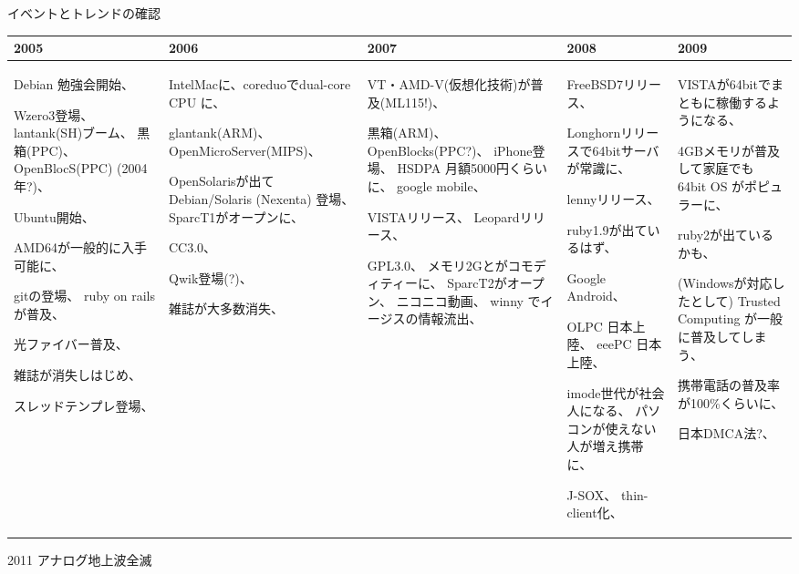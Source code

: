 \documentclass[cjk,dvipdfmx,12pt]{beamer}
\begin{document}
\begin{frame}

イベントとトレンドの確認

{\tiny
\begin{tabular}[t]{|p{6em}|p{6em}|p{6em}|p{6em}|p{6em}|}
\hline
2005 &2006 &2007 &2008 &2009 \\
\hline
Debian 勉強会開始、

Wzero3登場、
lantank(SH)ブーム、
黒箱(PPC)、
OpenBlocS(PPC) (2004年?)、

Ubuntu開始、

AMD64が一般的に入手可能に、

gitの登場、
ruby on rails が普及、

光ファイバー普及、

雑誌が消失しはじめ、

スレッドテンプレ登場、

 &
IntelMacに、coreduoでdual-core CPU に、

glantank(ARM)、
OpenMicroServer(MIPS)、

OpenSolarisが出てDebian/Solaris (Nexenta) 登場、
SparcT1がオープンに、

CC3.0、

Qwik登場(?)、

雑誌が大多数消失、

 &
VT・AMD-V(仮想化技術)が普及(ML115!)、

黒箱(ARM)、
OpenBlocks(PPC?)、
iPhone登場、
HSDPA 月額5000円くらいに、
google mobile、

VISTAリリース、
Leopardリリース、

GPL3.0、
メモリ2Gとがコモディティーに、
SparcT2がオープン、
ニコニコ動画、
winny でイージスの情報流出、
 &
FreeBSD7リリース、

Longhornリリースで64bitサーバが常識に、

lennyリリース、

ruby1.9が出ているはず、

Google Android、

OLPC 日本上陸、
eeePC 日本上陸、

imode世代が社会人になる、
パソコンが使えない人が増え携帯に、

J-SOX、
thin-client化、

&
VISTAが64bitでまともに稼働するようになる、

4GBメモリが普及して家庭でも 64bit OS がポピュラーに、

ruby2が出ているかも、

(Windowsが対応したとして) Trusted Computing が一般に普及してしまう、

携帯電話の普及率が100\%くらいに、

日本DMCA法?、

 \\

\hline
\end{tabular}
 }

2011 アナログ地上波全滅


\end{frame}
\end{document}
